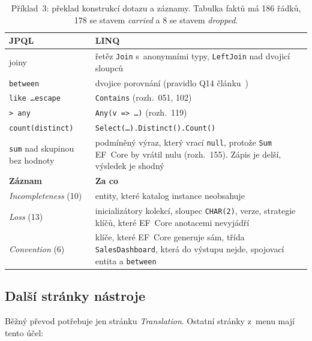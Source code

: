 \begin{table}[H]
\centering\footnotesize
\begin{tabularx}{\textwidth}{L{4.6cm} Y}
\toprule
\textbf{JPQL} & \textbf{LINQ} \\
\midrule
joiny & řetěz \texttt{Join} s~anonymními typy, \texttt{LeftJoin} nad dvojicí sloupců \\
\texttt{between} & dvojice porovnání (pravidlo Q14 článku~\cite{ormorpher-jss}) \\
\texttt{like \ldots escape} & \texttt{Contains} (rozh.~051, 102) \\
\texttt{> any} & \texttt{Any(v => \ldots)} (rozh.~119) \\
\texttt{count(distinct)} & \texttt{Select(\ldots).Distinct().Count()} \\
\texttt{sum} nad skupinou bez hodnoty & podmíněný výraz, který vrací \texttt{null}, protože \texttt{Sum} EF~Core by vrátil nulu (rozh.~155). Zápis je delší, výsledek je shodný \\
\midrule
\textbf{Záznam} & \textbf{Za co} \\
\midrule
\emph{Incompleteness} (10) & entity, které katalog instance neobsahuje \\
\emph{Loss} (13) & inicializátory kolekcí, sloupec \texttt{CHAR(2)}, verze, strategie klíčů, které EF~Core anotacemi nevyjádří \\
\emph{Convention} (6) & klíče, které EF~Core generuje sám, třída \texttt{SalesDashboard}, která do výstupu nejde, spojovací entita a \texttt{between} \\
\bottomrule
\end{tabularx}%
\caption{Příklad~3: překlad konstrukcí dotazu a záznamy. Tabulka faktů má 186 řádků, 178 se stavem \emph{carried} a 8 se stavem \emph{dropped}.}
\label{tab:ex3}
\end{table}

\subsection{Další stránky nástroje}\label{sec:stranky}

Běžný převod potřebuje jen stránku \emph{Translation}. Ostatní stránky z~menu mají tento účel:

